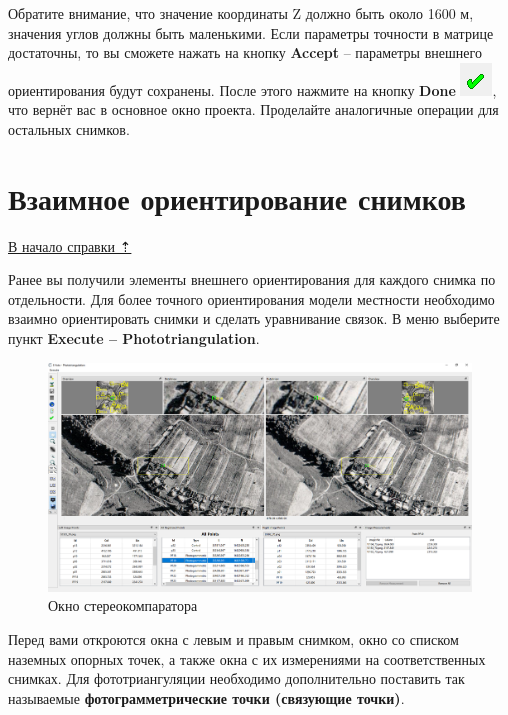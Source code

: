 \documentclass[
  12pt,
]{book}
\begin{document}
Обратите внимание, что значение координаты Z должно быть около 1600 м, значения углов должны быть маленькими. Если параметры точности в матрице достаточны, то вы сможете нажать на кнопку \textbf{Accept} -- параметры внешнего ориентирования будут сохранены. После этого нажмите на кнопку \textbf{Done} \includegraphics{images/Ref13/Done.png}, что вернёт вас в основное окно проекта. Проделайте аналогичные операции для остальных снимков.

\hypertarget{stereo-phototriangulation}{%
\section{Взаимное ориентирование снимков}\label{stereo-phototriangulation}}

\protect\hyperlink{stereo}{В начало справки ⇡}

Ранее вы получили элементы внешнего ориентирования для каждого снимка по отдельности. Для более точного ориентирования модели местности необходимо взаимно ориентировать снимки и сделать уравнивание связок. В меню выберите пункт \textbf{Execute -- Phototriangulation}.

\begin{figure}
\centering
\includegraphics{images/Ref13/Phototriangulation.png}
\caption{Окно стереокомпаратора}
\end{figure}

Перед вами откроются окна с левым и правым снимком, окно со списком наземных опорных точек, а также окна с их измерениями на соответственных снимках. Для фототриангуляции необходимо дополнительно поставить так называемые \textbf{фотограмметрические точки (связующие точки)}.
\end{document}

